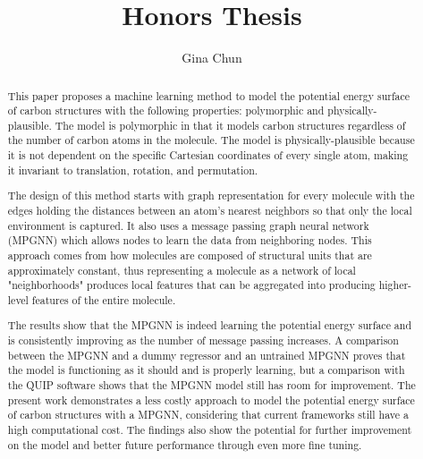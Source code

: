 \documentclass[12pt, abstract = true]{scrartcl}
\title{Honors Thesis}
\author{Gina Chun}
\begin{document}
\maketitle

\newpage

\begin{abstract}

This paper proposes a machine learning method to model the potential energy surface of carbon structures with the following properties: polymorphic and physically-plausible. The model is polymorphic in that it models carbon structures regardless of the number of carbon atoms in the molecule. The model is physically-plausible because it is not dependent on the specific Cartesian coordinates of every single atom, making it invariant to translation, rotation, and permutation. 

The design of this method starts with graph representation for every molecule with the edges holding the distances between an atom's nearest neighbors so that only the local environment is captured. It also uses a message passing graph neural network (MPGNN) which allows nodes to learn the data from neighboring nodes. This approach comes from how molecules are composed of structural units that are approximately constant, thus representing a molecule as a network of local "neighborhoods" produces local features that can be aggregated into producing higher-level features of the entire molecule. 

The results show that the MPGNN is indeed learning the potential energy surface and is consistently improving as the number of message passing increases. A comparison between the MPGNN and a dummy regressor and an untrained MPGNN proves that the model is functioning as it should and is properly learning, but a comparison with the QUIP software shows that the MPGNN model still has room for improvement. The present work demonstrates a less costly approach to model the potential energy surface of carbon structures with a MPGNN, considering that current frameworks still have a high computational cost. The findings also show the potential for further improvement on the model and better future performance through even more fine tuning.
  
\end{abstract}

\newpage

\tableofcontents
\end{document}
